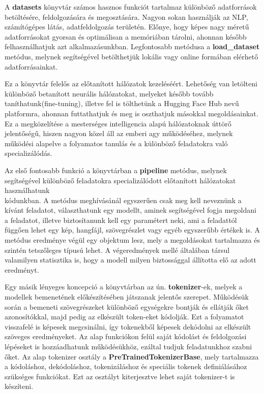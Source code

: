 
A \textbf{datasets} könyvtár számos hasznos funkciót tartalmaz különböző adatforrások betöltésére, feldolgozására és megosztására. Nagyon sokan használják az NLP, számítógépes látás, adatfeldolgozás területén. Előnye, hogy képes nagy méretű adatforrásokat gyorsan és optimálisan a memóriában tárolni, ahonnan később felhasználhatjuk azt alkalmazásunkban. Legfontosabb metódusa a \textbf{load\_dataset} metódus, melynek segítségével betölthetjük lokális vagy online formában elérhető adatforrásainkat.


Ez a könyvtár felelős az előtanított hálózatok kezeléséért. Lehetőség van letölteni különböző betanított neurális hálózatokat, melyeket később tovább taníthatunk(fine-tuning), illetve fel is tölthetünk a Hugging Face Hub nevű platformra, ahonnan futtathatjuk és meg is oszthatjuk másokkal megoldásainkat. Ez a megközelítése a mesterséges intelligencia alapú hálózatoknak úttörő jelentőségű, hiszen nagyon közel áll az emberi agy működéséhez, melynek működési alapelve a folyamatos tanulás és a különböző  feladatokra való specializálódás.

Az első fontosabb funkció a könyvtárban a \textbf{pipeline} metódus, melynek segítségével különböző feladatokra specializálódott előtanított hálózatokat használhatunk \\
kódunkban\cite{hf}. A metódus meghívásánál egyszerűen csak meg kell neveznünk a kívánt feladatot, választhatunk egy modellt, aminek segítségével fogja megoldani a feladatot, illetve biztosítanunk kell egy paramétert neki, ami a feladattól függően lehet egy kép, hangfájl, szövegrészlet vagy egyéb egyszerűbb értékek is. A metódus eredménye végül egy objektum lesz, mely a megoldásokat tartalmazza és szintén tetszőleges típusú lehet. A végeredmények mellé általában társul valamilyen statisztika is, hogy a modell milyen biztossággal állította elő az adott eredményt.

Egy másik lényeges koncepció a könyvtárban az ún. \textbf{tokenizer}-ek, melyek a modellek bemenetének előkészítésében játszanak jelentős szerepet. Működésük során a bemeneti szövegrészeket különböző egységekre bontják és ellátják őket azonosítókkal, majd pedig az elkészült token-eket kódolják\cite{hf}. Ezt a folyamatot visszafelé is képesek megcsinálni, így tokenekből képesek dekódolni az elkészült szöveges eredményeket. Az alap funkciókon felül saját kódolást és feldolgozási lépéseket is hozzáadhatunk működésükhöz, ezáltal tudjuk feladatunkhoz szabni őket. Az alap tokenizer osztály a \textbf{PreTrainedTokenizerBase}, mely tartalmazza a kódoláshoz, dekódoláshoz, tokenizáláshoz és speciális tokenek definiálásához szükséges funkciókat. Ezt az osztályt kiterjesztve lehet saját tokenizer-t is készíteni.

